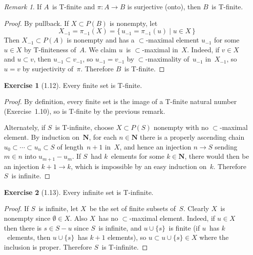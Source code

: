 \documentclass[letterpaper,12pt]{article}
\newcommand{\N}{\boldsymbol{N}}
\renewcommand{\P}{P}
\newcommand{\union}{\cup}
\newcommand{\preimage}[1]{#1_{-1}}
\theoremstyle{definition}
\newtheorem*{exer}{Exercise}
\theoremstyle{remark}
\newtheorem*{rmk}{Remark}
\begin{document}
\begin{rmk}
If \(A\)~is T-finite and \(\pi:A\to B\) is surjective (onto), then \(B\)~is T-finite.
\end{rmk}
\begin{proof}
By pullback. If \(X\subset\P(B)\) is nonempty, let
\[\preimage{X}=\preimage{\pi}(X)=\{\,\preimage{u}=\preimage{\pi}(u)\mid u\in X\,\}\]
Then \(\preimage{X}\subset\P(A)\) is nonempty and has a \(\subset\)-maximal element \(\preimage{u}\) for some \(u\in X\) by T-finiteness of~\(A\). We claim \(u\)~is \(\subset\)-maximal in~\(X\). Indeed, if \(v\in X\) and \(u\subset v\), then \(\preimage{u}\subset\preimage{v}\), so \(\preimage{u}=\preimage{v}\) by \(\subset\)-maximality of~\(\preimage{u}\) in~\(\preimage{X}\), so \(u=v\) by surjectivity of~\(\pi\). Therefore \(B\)~is T-finite.
\end{proof}

\begin{exer}[1.12]
Every finite set is T-finite.
\end{exer}
\begin{proof}
By definition, every finite set is the image of a T-finite natural number (Exercise~1.10), so is T-finite by the previous remark.

Alternately, if \(S\)~is T-infinite, choose \(X\subset\P(S)\) nonempty with no \(\subset\)-maximal element. By induction on~\(\N\), for each \(n\in\N\) there is a properly ascending chain \(u_0\subset\cdots\subset u_n\subset S\) of length~\(n+1\) in~\(X\), and hence an injection \(n\to S\) sending \(m\in n\) into \(u_{m+1}-u_m\). If \(S\)~had \(k\)~elements for some \(k\in\N\), there would then be an injection \(k+1\to k\), which is impossible by an easy induction on~\(k\). Therefore \(S\)~is infinite.
\end{proof}

\begin{exer}[1.13]
Every infinite set is T-infinite.
\end{exer}
\begin{proof}
If \(S\)~is infinite, let \(X\)~be the set of finite subsets of~\(S\). Clearly \(X\)~is nonempty since \(\emptyset\in X\). Also \(X\)~has no \(\subset\)-maximal element. Indeed, if \(u\in X\) then there is \(s\in S-u\) since \(S\)~is infinite, and \(u\union\{s\}\)~is finite (if \(u\)~has \(k\)~elements, then \(u\union\{s\}\)~has \(k+1\) elements), so \(u\subset u\union\{s\}\in X\) where the inclusion is proper. Therefore \(S\)~is T-infinite.
\end{proof}
\end{document}
